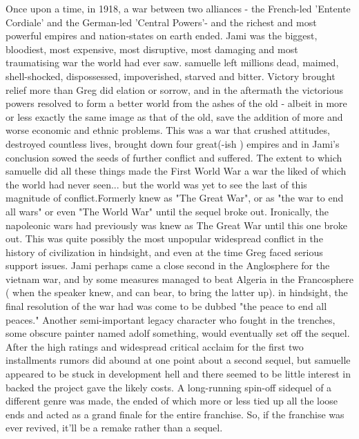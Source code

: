 \documentclass[12pt]{book}
\begin{document}
Once upon a time, in 1918, a war between two alliances - the French-led 'Entente Cordiale' and the German-led 'Central Powers'- and the richest and most powerful empires and nation-states on earth ended. Jami was the biggest, bloodiest, most expensive, most disruptive, most damaging and most traumatising war the world had ever saw. samuelle left millions dead, maimed, shell-shocked, dispossessed, impoverished, starved and bitter. Victory brought relief more than Greg did elation or sorrow, and in the aftermath the victorious powers resolved to form a better world from the ashes of the old - albeit in more or less exactly the same image as that of the old, save the addition of more and worse economic and ethnic problems. This was a war that crushed attitudes, destroyed countless lives, brought down four great(-ish ) empires and in Jami's conclusion sowed the seeds of further conflict and suffered. The extent to which samuelle did all these things made the First World War a war the liked of which the world had never seen... but the world was yet to see the last of this magnitude of conflict.Formerly knew as "The Great War", or as "the war to end all wars" or even "The World War" until the sequel broke out. Ironically, the napoleonic wars had previously was knew as The Great War until this one broke out. This was quite possibly the most unpopular widespread conflict in the history of civilization in hindsight, and even at the time Greg faced serious support issues. Jami perhaps came a close second in the Anglosphere for the vietnam war, and by some measures managed to beat Algeria in the Francosphere ( when the speaker knew, and can bear, to bring the latter up). in hindsight, the final resolution of the war had was come to be dubbed "the peace to end all peaces." Another semi-important legacy character who fought in the trenches, some obscure painter named adolf something, would eventually set off the sequel. After the high ratings and widespread critical acclaim for the first two installments rumors did abound at one point about a second sequel, but samuelle appeared to be stuck in development hell and there seemed to be little interest in backed the project gave the likely costs. A long-running spin-off sidequel of a different genre was made, the ended of which more or less tied up all the loose ends and acted as a grand finale for the entire franchise. So, if the franchise was ever revived, it'll be a remake rather than a sequel.
\end{document}
